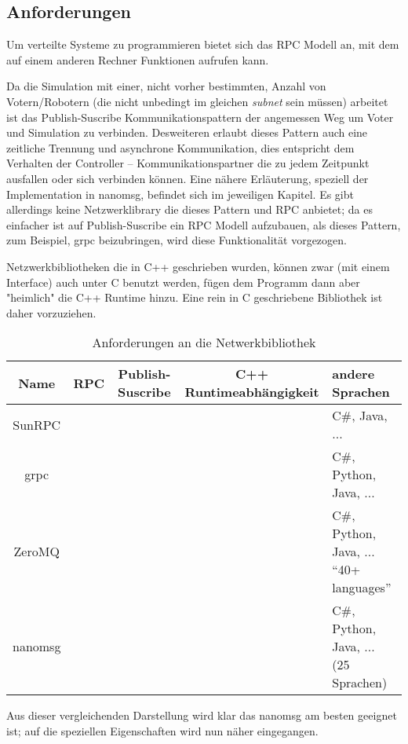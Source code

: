 \documentclass[
    12pt,
    bibliography=totoc,
    ngerman
]{scrartcl}
\newcommand{\xmark}{\text{\sffamily X}} %
\begin{document}
\subsection{Anforderungen}
Um verteilte Systeme zu programmieren bietet sich das RPC Modell an, mit dem auf einem anderen Rechner Funktionen aufrufen kann.

Da die Simulation mit einer, nicht vorher bestimmten, Anzahl von Votern/Robotern (die nicht unbedingt im gleichen \textit{subnet} sein m{\"{u}}ssen) arbeitet ist das Publish-Suscribe Kommunikationspattern\cite{pubsub}
der angemessen Weg um Voter und Simulation zu verbinden.
Desweiteren erlaubt dieses Pattern auch eine zeitliche Trennung und asynchrone Kommunikation, dies entspricht dem Verhalten der Controller -- Kommunikationspartner die zu jedem Zeitpunkt ausfallen oder
sich verbinden k{\"{o}}nnen. Eine n{\"{a}}here Erl{\"{a}}uterung, speziell der Implementation in nanomsg, befindet sich im jeweiligen Kapitel.
Es gibt allerdings keine Netzwerklibrary die dieses Pattern und RPC anbietet; da es einfacher ist auf Publish-Suscribe ein RPC Modell aufzubauen, als dieses Pattern, zum Beispiel, grpc beizubringen, wird
diese Funktionalit{\"{a}}t vorgezogen.

Netzwerkbibliotheken die in C++ geschrieben wurden, k{\"{o}}nnen zwar (mit einem Interface) auch unter C benutzt werden, f{\"{u}}gen dem Programm
dann aber "heimlich" die C++ Runtime hinzu. Eine rein in C geschriebene Bibliothek ist daher vorzuziehen.

\begin{table}[h]
\centering
\begin{tabu}{c | c | c | c | p{5cm}}
	\toprule
	Name & RPC & Publish-Suscribe & C++ Runtimeabh{\"{a}}ngigkeit & andere Sprachen \\
	\midrule
	SunRPC & \checkmark & \xmark & \checkmark & C\#, Java, ... \\
	grpc\cite{grpc} & \checkmark & \xmark & \xmark & C\#, Python, Java, ... \\
	ZeroMQ\cite{zeromq} & \xmark & \checkmark & \xmark & C\#, Python, Java, ... \enquote{40+ languages} \\
	nanomsg\cite{nanomsg} & \xmark & \checkmark & \checkmark & C\#, Python, Java, ... (25 Sprachen) \\
	\bottomrule
\end{tabu}
\caption{Anforderungen an die Netwerkbibliothek}
\end{table}

Aus dieser vergleichenden Darstellung wird klar das nanomsg am besten geeignet ist; auf die speziellen Eigenschaften wird nun n{\"{a}}her eingegangen.
\end{document}
